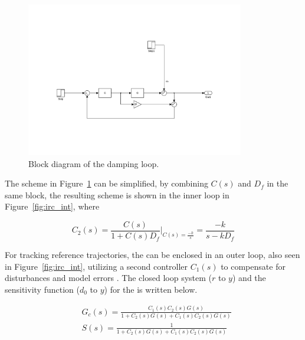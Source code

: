 \begin{figure}[h]
  \centering %
  \includegraphics[width=0.85\textwidth, trim=5.5cm 4cm 5.1cm 9.5cm, clip=true]{fig/matlab/irc}
  \caption{\label{fig:irc}Block diagram of the \abbrIRC damping loop.}
\end{figure}

The \abbrIRC scheme in Figure~\ref{fig:irc} can be simplified, by combining $C(s)$ and $D_f$ in the same block, the resulting scheme is shown in the inner loop in Figure~\ref{fig:irc_int}, where

\begin{equation}
  \label{eq:C2}
  C_2(s) = \frac{C(s)}{1+C(s)D_f}\Bigg|_{C(s) = \frac{-k}{s}} = \frac{-k}{s - kD_f}
\end{equation}

For tracking reference trajectories, the \abbrIRC can be enclosed in an outer loop, also seen in Figure~\ref{fig:irc_int}, utilizing a second controller $C_1(s)$ to compensate for disturbances and model errors \citep{gu:2014}. The closed loop system ($r$ to $y$) and the sensitivity function ($d_0$ to $y$) for the \abbrIRC is written below.

\begin{subequations}
  \label{eq:discrsys}
  \begin{alignat}{2}
    & G_c(s) = \frac{C_1(s)C_2(s)G(s)}{1 + C_2(s)G(s) + C_1(s)C_2(s)G(s)} \\
    & S(s) = \frac{1}{1 + C_2(s)G(s) + C_1(s)C_2(s)G(s)} \label{eq:discrsys1}
  \end{alignat}
\end{subequations}

